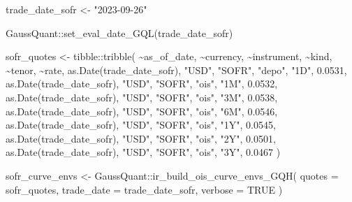 \documentclass[
  letterpaper,
  DIV=11,
  numbers=noendperiod]{scrreprt}
\newenvironment{Shaded}{\begin{snugshade}}{\end{snugshade}}
\newcommand{\AttributeTok}[1]{\textcolor[rgb]{0.40,0.45,0.13}{#1}}
\newcommand{\ConstantTok}[1]{\textcolor[rgb]{0.56,0.35,0.01}{#1}}
\newcommand{\FloatTok}[1]{\textcolor[rgb]{0.68,0.00,0.00}{#1}}
\newcommand{\FunctionTok}[1]{\textcolor[rgb]{0.28,0.35,0.67}{#1}}
\newcommand{\NormalTok}[1]{\textcolor[rgb]{0.00,0.23,0.31}{#1}}
\newcommand{\OtherTok}[1]{\textcolor[rgb]{0.00,0.23,0.31}{#1}}
\newcommand{\SpecialCharTok}[1]{\textcolor[rgb]{0.37,0.37,0.37}{#1}}
\newcommand{\StringTok}[1]{\textcolor[rgb]{0.13,0.47,0.30}{#1}}
\begin{document}
\begin{Shaded}
\begin{Highlighting}[]
\NormalTok{trade\_date\_sofr }\OtherTok{\textless{}{-}} \StringTok{"2023{-}09{-}26"}

\NormalTok{GaussQuant}\SpecialCharTok{::}\FunctionTok{set\_eval\_date\_GQL}\NormalTok{(trade\_date\_sofr)}

\NormalTok{sofr\_quotes }\OtherTok{\textless{}{-}}\NormalTok{ tibble}\SpecialCharTok{::}\FunctionTok{tribble}\NormalTok{(}
  \SpecialCharTok{\textasciitilde{}}\NormalTok{as\_of\_date, }\SpecialCharTok{\textasciitilde{}}\NormalTok{currency, }\SpecialCharTok{\textasciitilde{}}\NormalTok{instrument, }\SpecialCharTok{\textasciitilde{}}\NormalTok{kind, }\SpecialCharTok{\textasciitilde{}}\NormalTok{tenor, }\SpecialCharTok{\textasciitilde{}}\NormalTok{rate,}
  \FunctionTok{as.Date}\NormalTok{(trade\_date\_sofr), }\StringTok{"USD"}\NormalTok{, }\StringTok{"SOFR"}\NormalTok{, }\StringTok{"depo"}\NormalTok{, }\StringTok{"1D"}\NormalTok{, }\FloatTok{0.0531}\NormalTok{,}
  \FunctionTok{as.Date}\NormalTok{(trade\_date\_sofr), }\StringTok{"USD"}\NormalTok{, }\StringTok{"SOFR"}\NormalTok{, }\StringTok{"ois"}\NormalTok{,  }\StringTok{"1M"}\NormalTok{, }\FloatTok{0.0532}\NormalTok{,}
  \FunctionTok{as.Date}\NormalTok{(trade\_date\_sofr), }\StringTok{"USD"}\NormalTok{, }\StringTok{"SOFR"}\NormalTok{, }\StringTok{"ois"}\NormalTok{,  }\StringTok{"3M"}\NormalTok{, }\FloatTok{0.0538}\NormalTok{,}
  \FunctionTok{as.Date}\NormalTok{(trade\_date\_sofr), }\StringTok{"USD"}\NormalTok{, }\StringTok{"SOFR"}\NormalTok{, }\StringTok{"ois"}\NormalTok{,  }\StringTok{"6M"}\NormalTok{, }\FloatTok{0.0546}\NormalTok{,}
  \FunctionTok{as.Date}\NormalTok{(trade\_date\_sofr), }\StringTok{"USD"}\NormalTok{, }\StringTok{"SOFR"}\NormalTok{, }\StringTok{"ois"}\NormalTok{,  }\StringTok{"1Y"}\NormalTok{, }\FloatTok{0.0545}\NormalTok{,}
  \FunctionTok{as.Date}\NormalTok{(trade\_date\_sofr), }\StringTok{"USD"}\NormalTok{, }\StringTok{"SOFR"}\NormalTok{, }\StringTok{"ois"}\NormalTok{,  }\StringTok{"2Y"}\NormalTok{, }\FloatTok{0.0501}\NormalTok{,}
  \FunctionTok{as.Date}\NormalTok{(trade\_date\_sofr), }\StringTok{"USD"}\NormalTok{, }\StringTok{"SOFR"}\NormalTok{, }\StringTok{"ois"}\NormalTok{,  }\StringTok{"3Y"}\NormalTok{, }\FloatTok{0.0467}
\NormalTok{)}

\NormalTok{sofr\_curve\_envs }\OtherTok{\textless{}{-}}\NormalTok{ GaussQuant}\SpecialCharTok{::}\FunctionTok{ir\_build\_ois\_curve\_envs\_GQH}\NormalTok{(}
  \AttributeTok{quotes =}\NormalTok{ sofr\_quotes,}
  \AttributeTok{trade\_date =}\NormalTok{ trade\_date\_sofr,}
  \AttributeTok{verbose =} \ConstantTok{TRUE}
\NormalTok{)}


\end{Highlighting}
\end{Shaded}
\end{document}
